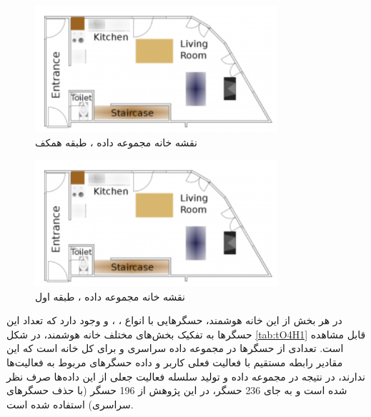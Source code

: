 \begin{figure}[H]
\centerline{\includegraphics[width=0.8\textwidth]{figs/fO4H1.png}}
\caption{نقشه خانه مجموعه داده ، طبقه همکف}
\label{fig:fO4H1}
\end{figure}

\begin{figure}[H]
\centerline{\includegraphics[width=0.8\textwidth]{figs/fO4H1.png}}
\caption{نقشه خانه مجموعه داده ، طبقه اول}
\label{fig:fO4H2}
\end{figure}

در هر بخش از این خانه هوشمند، حسگرهایی با انواع ، ،  و  وجود دارد که تعداد این حسگرها به تفکیک بخش‌های مختلف خانه هوشمند، در شکل \ref{tab:tO4H1} قابل مشاهده است. تعدادی از حسگرها در مجموعه داده  سراسری و برای کل خانه است که این مقادیر رابطه مستقیم با فعالیت فعلی کاربر و داده حسگرهای مربوط به فعالیت‌ها ندارند، در نتیجه در مجموعه داده و تولید سلسله فعالیت جعلی از این داده‌ها صرف نظر شده است و به جای 236 حسگر، در این پژوهش از 196 حسگر (با حذف حسگرهای سراسری) استفاده شده است.

